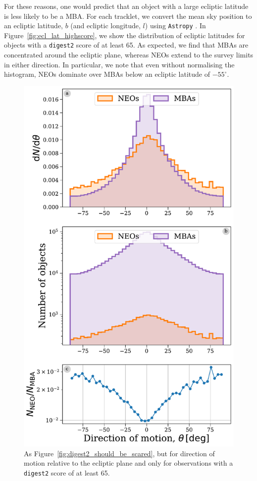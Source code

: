 \documentclass[twocolumn, twocolappendix]{aastex631}
\newcommand{\dig}{\texttt{digest2}}
\begin{document}
For these reasons, one would predict that an object with a large ecliptic latitude is less likely to be a MBA. For each tracklet, we convert the mean sky position to an ecliptic latitude, $b$ (and ecliptic longitude, $l$) using \texttt{Astropy} \citep{astropy:2013,astropy:2018,astropy:2022}. In Figure~\ref{fig:ecl_lat_highscore}, we show the distribution of ecliptic latitudes for objects with a \dig{} score of at least 65. As expected, we find that MBAs are concentrated around the ecliptic plane, whereas NEOs extend to the survey limits in either direction. In particular, we note that even without normalising the histogram, NEOs dominate over MBAs below an ecliptic latitude of $-55^{\circ}$.

\begin{figure}[htb]
    \centering
    \includegraphics[width=\columnwidth]{figures/direction_dist_highscore.pdf}
    \caption{As Figure~\ref{fig:digest2_should_be_scared}, but for direction of motion relative to the ecliptic plane and only for observations with a \dig{} score of at least 65.}
    \label{fig:dir_highscore}
\end{figure}
\end{document}

